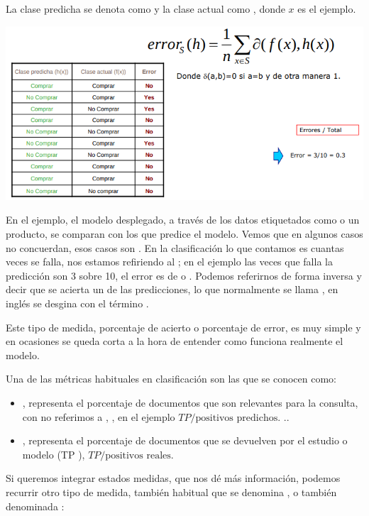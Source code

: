 La clase predicha se denota como  y la clase actual como , donde $x$ es el ejemplo.
\begin{center}
    \includegraphics[scale=.65]{images/mod02-01.png}
\end{center}
En el ejemplo, el modelo desplegado, a través de los datos etiquetados como  o  un producto, se comparan con los que predice el modelo. Vemos que en algunos casos no concuerdan, esos casos son . En la clasificación lo que contamos es cuantas veces se falla, nos estamos refiriendo al ; en el ejemplo las veces que falla la predicción son 3 sobre 10, el error es de  o . Podemos referirnos de forma inversa y decir que se acierta un  de las predicciones, lo que normalmente se llama , en inglés se desgina con el término .

Este tipo de medida, porcentaje de acierto o porcentaje de error, es muy simple y en ocasiones se queda corta a la hora de entender como funciona realmente el modelo.

Una de las métricas habituales en clasificación son las que se conocen como:
\begin{itemize}
    \item {},  representa el porcentaje de documentos que son relevantes para la consulta, con  no referimos a , , en el ejemplo $TP/ \text{positivos predichos}$.
    ..
    \item {}, representa el porcentaje de documentos que se devuelven por el estudio o modelo (TP ), $TP/ \text{positivos reales}$.
\end{itemize}

Si queremos integrar estados medidas, que nos dé más información, podemos recurrir otro tipo de medida, también habitual que se denomina , o también denominada :


